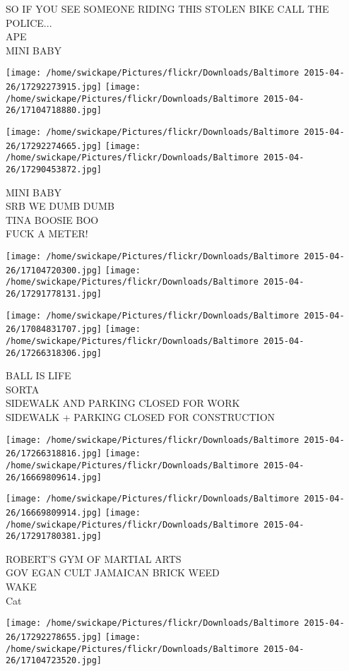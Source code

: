 \documentclass[10pt,letterpaper]{article}
\begin{document}
SO IF YOU SEE SOMEONE RIDING THIS STOLEN BIKE CALL THE POLICE...\\
APE\\
MINI BABY
\pagebreak

\texttt{[image: /home/swickape/Pictures/flickr/Downloads/Baltimore 2015-04-26/17292273915.jpg]}
\texttt{[image: /home/swickape/Pictures/flickr/Downloads/Baltimore 2015-04-26/17104718880.jpg]}

\texttt{[image: /home/swickape/Pictures/flickr/Downloads/Baltimore 2015-04-26/17292274665.jpg]}
\texttt{[image: /home/swickape/Pictures/flickr/Downloads/Baltimore 2015-04-26/17290453872.jpg]}

MINI BABY\\
SRB WE DUMB DUMB\\
TINA BOOSIE BOO\\
FUCK A METER!
\pagebreak

\texttt{[image: /home/swickape/Pictures/flickr/Downloads/Baltimore 2015-04-26/17104720300.jpg]}
\texttt{[image: /home/swickape/Pictures/flickr/Downloads/Baltimore 2015-04-26/17291778131.jpg]}

\texttt{[image: /home/swickape/Pictures/flickr/Downloads/Baltimore 2015-04-26/17084831707.jpg]}
\texttt{[image: /home/swickape/Pictures/flickr/Downloads/Baltimore 2015-04-26/17266318306.jpg]}

BALL IS LIFE\\
SORTA\\
SIDEWALK AND PARKING CLOSED FOR WORK\\
SIDEWALK + PARKING CLOSED FOR CONSTRUCTION
\pagebreak

\texttt{[image: /home/swickape/Pictures/flickr/Downloads/Baltimore 2015-04-26/17266318816.jpg]}
\texttt{[image: /home/swickape/Pictures/flickr/Downloads/Baltimore 2015-04-26/16669809614.jpg]}

\texttt{[image: /home/swickape/Pictures/flickr/Downloads/Baltimore 2015-04-26/16669809914.jpg]}
\texttt{[image: /home/swickape/Pictures/flickr/Downloads/Baltimore 2015-04-26/17291780381.jpg]}

ROBERT'S GYM OF MARTIAL ARTS\\
GOV EGAN CULT JAMAICAN BRICK WEED\\
WAKE\\
Cat
\pagebreak

\texttt{[image: /home/swickape/Pictures/flickr/Downloads/Baltimore 2015-04-26/17292278655.jpg]}
\texttt{[image: /home/swickape/Pictures/flickr/Downloads/Baltimore 2015-04-26/17104723520.jpg]}
\end{document}
